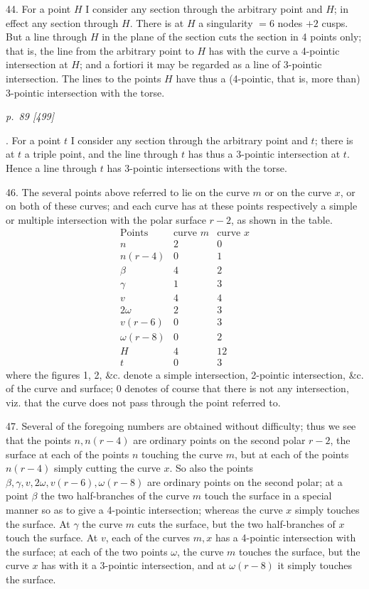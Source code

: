\documentclass[11pt,a4paper]{article}
\newcommand{\pagemarker}[2]{\clearpage\noindent\textit{p.~#1 [#2]}\par\medskip}
\begin{document}
44. For a point \(H\) I consider any section through the arbitrary point and \(H\);
in effect any section through \(H\). There is at \(H\) a singularity \(=6\) nodes
\(+2\) cusps. But a line through \(H\) in the plane of the section cuts the section in
4 points only; that is, the line from the arbitrary point to \(H\) has with the curve a
4-pointic intersection at \(H\); and a fortiori it may be regarded as a line of
3-pointic intersection. The lines to the points \(H\) have thus a (4-pointic, that is,
more than) 3-pointic intersection with the torse.

\pagemarker{89}{499}
45. For a point \(t\) I consider any section through the arbitrary point and \(t\);
there is at \(t\) a triple point, and the line through \(t\) has thus a 3-pointic
intersection at \(t\). Hence a line through \(t\) has 3-pointic intersections with the
torse.

46. The several points above referred to lie on the curve \(m\) or on the curve \(x\),
or on both of these curves; and each curve has at these points respectively a simple
or multiple intersection with the polar surface \(r-2\), as shown in the table.
\[
\begin{array}{c|cc}
\text{Points} & \text{curve }m & \text{curve }x\\ \hline
n & 2&0\\
n(r-4)&0&1\\
\beta&4&2\\
\gamma&1&3\\
v&4&4\\
2\omega&2&3\\
v(r-6)&0&3\\
\omega(r-8)&0&2\\
H&4&12\\
t&0&3
\end{array}
\]
where the figures 1, 2, \&c. denote a simple intersection, 2-pointic intersection,
\&c. of the curve and surface; 0 denotes of course that there is not any intersection,
viz. that the curve does not pass through the point referred to.

47. Several of the foregoing numbers are obtained without difficulty; thus we see
that the points \(n,n(r-4)\) are ordinary points on the second polar \(r-2\), the
surface at each of the points \(n\) touching the curve \(m\), but at each of the points
\(n(r-4)\) simply cutting the curve \(x\). So also the points
\(\beta,\gamma,v,2\omega,v(r-6),\omega(r-8)\) are ordinary points on the second polar;
at a point \(\beta\) the two half-branches of the curve \(m\) touch the surface in a
special manner so as to give a 4-pointic intersection; whereas the curve \(x\) simply
touches the surface. At \(\gamma\) the curve \(m\) cuts the surface, but the two
half-branches of \(x\) touch the surface. At \(v\), each of the curves \(m,x\) has a
4-pointic intersection with the surface; at each of the two points \(\omega\), the
curve \(m\) touches the surface, but the curve \(x\) has with it a 3-pointic
intersection, and at \(\omega(r-8)\) it simply touches the surface.
\end{document}
